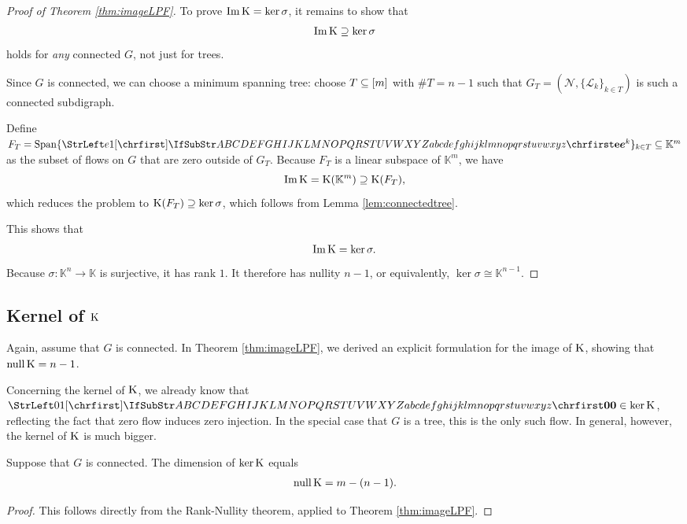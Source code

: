 \documentclass[main.tex]{subfiles}
\begin{document}
\begin{proof}[Proof of Theorem \ref{thm:imageLPF}]
To prove $\operatorname{Im} \text{\textup{K}} = \ker \sigma$, it remains to show that
\begin{gather}
\operatorname{Im} \text{\textup{K}} \supseteq \ker \sigma
\end{gather}
holds for \emph{any} connected $G$, not just for trees.

Since $G$ is connected, we can choose a minimum spanning tree: choose $T \subseteq [m]$ with $\# T = n-1$ such that $G_T=(\mathcal{N}, \{\mathcal{L}_k\}_{k \in T})$ is such a connected subdigraph.

Define $F_T = \linspan \{\mat{e}^k\}_{k \in T} \subseteq \mathbb{K}^m$ as the subset of flows on $G$ that are zero outside of $G_T$. Because $F_T$ is a linear subspace of $\mathbb{K}^m$, we have
$$\operatorname{Im} \text{\textup{K}} = \text{\textup{K}} (\mathbb{K}^m) \supseteq \text{\textup{K}}(F_T),$$
which reduces the problem to $\text{\textup{K}}(F_T) \supseteq \ker \sigma$, which follows from Lemma \ref{lem:connectedtree}.

This shows that
\begin{gather*}
    \operatorname{Im} \text{\textup{K}} = \ker \sigma.
\end{gather*}
Because $\sigma : \mathbb{K}^n \rightarrow \mathbb{K}$ is surjective, it has rank $1$. It therefore has nullity $n-1$, or equivalently, $\ker \sigma \cong \mathbb{K}^{n-1}$.
\end{proof}









\subsection{Kernel of $\mathbf{\text{\textup{K}}}$}

Again, assume that $G$ is connected. In Theorem \ref{thm:imageLPF}, we derived an explicit formulation for the image of $\text{\textup{K}}$, showing that $\operatorname{null} \text{\textup{K}} = n-1$.

Concerning the kernel of $\text{\textup{K}}$, we already know that $\mat{0} \in \ker \FRT$, reflecting the fact that zero flow induces zero injection. In the special case that $G$ is a tree, this is the only such flow. In general, however, the kernel of $\text{\textup{K}}$ is much bigger.

\begin{proposition}\label{prop:nullityLPF}
Suppose that $G$ is connected. The dimension of $\ker \text{\textup{K}}$ equals
\begin{gather*}
    \operatorname{null} \text{\textup{K}} = m - (n - 1).
\end{gather*}
\end{proposition}
\begin{proof}
This follows directly from the Rank-Nullity theorem, applied to Theorem \ref{thm:imageLPF}.
\end{proof}
\end{document}
